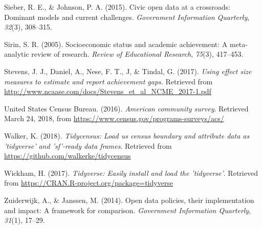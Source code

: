 \documentclass[man, fleqn, noextraspace]{apa6}
\theoremstyle{definition}
\theoremstyle{definition}
\theoremstyle{definition}
\theoremstyle{remark}
\begin{document}
\leavevmode\hypertarget{ref-sieber15}{}%
Sieber, R. E., \& Johnson, P. A. (2015). Civic open data at a
crossroads: Dominant models and current challenges. \emph{Government
Information Quarterly}, \emph{32}(3), 308--315.

\leavevmode\hypertarget{ref-sirin05}{}%
Sirin, S. R. (2005). Socioeconomic status and academic achievement: A
meta-analytic review of research. \emph{Review of Educational Research},
\emph{75}(3), 417--453.

\leavevmode\hypertarget{ref-stevens17}{}%
Stevens, J. J., Daniel, A., Nese, F. T., J, \& Tindal, G. (2017).
\emph{Using effect size measures to estimate and report achievement
gaps}. Retrieved from
\url{http://www.ncaase.com/docs/Stevens_et_al_NCME_2017-1.pdf}

\leavevmode\hypertarget{ref-acs}{}%
United States Census Bureau. (2016). \emph{American community survey}.
Retrieved March 24, 2018, from
\url{https://www.census.gov/programs-surveys/acs/}

\leavevmode\hypertarget{ref-tidycensus}{}%
Walker, K. (2018). \emph{Tidycensus: Load us census boundary and
attribute data as 'tidyverse' and 'sf'-ready data frames}. Retrieved
from \url{https://github.com/walkerke/tidycensus}

\leavevmode\hypertarget{ref-tidyverse}{}%
Wickham, H. (2017). \emph{Tidyverse: Easily install and load the
'tidyverse'}. Retrieved from
\url{https://CRAN.R-project.org/package=tidyverse}

\leavevmode\hypertarget{ref-zuiderwijk14}{}%
Zuiderwijk, A., \& Janssen, M. (2014). Open data policies, their
implementation and impact: A framework for comparison. \emph{Government
Information Quarterly}, \emph{31}(1), 17--29.

\endgroup
\end{document}
